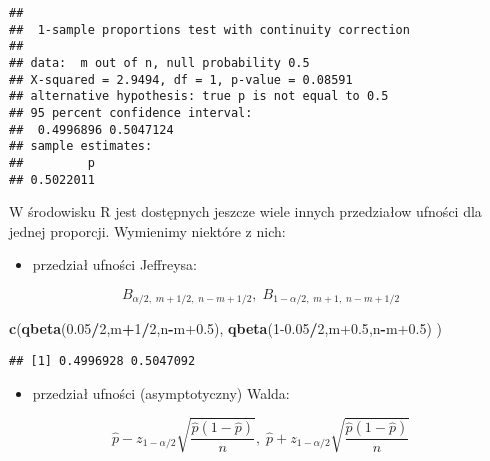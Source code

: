 \documentclass[polish,]{book}
\newenvironment{Shaded}{\begin{snugshade}}{\end{snugshade}}
\newcommand{\DecValTok}[1]{\textcolor[rgb]{0.00,0.00,0.81}{#1}}
\newcommand{\FloatTok}[1]{\textcolor[rgb]{0.00,0.00,0.81}{#1}}
\newcommand{\KeywordTok}[1]{\textcolor[rgb]{0.13,0.29,0.53}{\textbf{#1}}}
\newcommand{\NormalTok}[1]{#1}
\newcommand{\OperatorTok}[1]{\textcolor[rgb]{0.81,0.36,0.00}{\textbf{#1}}}
\providecommand{\tightlist}{%
  \setlength{\itemsep}{0pt}\setlength{\parskip}{0pt}}
\begin{document}
\begin{verbatim}
## 
##  1-sample proportions test with continuity correction
## 
## data:  m out of n, null probability 0.5
## X-squared = 2.9494, df = 1, p-value = 0.08591
## alternative hypothesis: true p is not equal to 0.5
## 95 percent confidence interval:
##  0.4996896 0.5047124
## sample estimates:
##         p 
## 0.5022011
\end{verbatim}

W środowisku R jest dostępnych jeszcze wiele innych przedziałow ufności dla
jednej proporcji. Wymienimy niektóre z nich:

\begin{itemize}
\tightlist
\item
  przedział ufności Jeffreysa:
\end{itemize}

\begin{equation}
B_{\alpha/2,\;m+1/2,\;n-m+1/2},\;B_{1-\alpha/2,\;m+1,\;n-m+1/2}
\label{eq:wz1159}
\end{equation}

\begin{Shaded}
\begin{Highlighting}[]
\KeywordTok{c}\NormalTok{(}\KeywordTok{qbeta}\NormalTok{(}\FloatTok{0.05}\OperatorTok{/}\DecValTok{2}\NormalTok{,m}\OperatorTok{+}\DecValTok{1}\OperatorTok{/}\DecValTok{2}\NormalTok{,n}\OperatorTok{-}\NormalTok{m}\FloatTok{+0.5}\NormalTok{), }\KeywordTok{qbeta}\NormalTok{(}\DecValTok{1}\FloatTok{-0.05}\OperatorTok{/}\DecValTok{2}\NormalTok{,m}\FloatTok{+0.5}\NormalTok{,n}\OperatorTok{-}\NormalTok{m}\FloatTok{+0.5}\NormalTok{) )}
\end{Highlighting}
\end{Shaded}

\begin{verbatim}
## [1] 0.4996928 0.5047092
\end{verbatim}

\begin{itemize}
\tightlist
\item
  przedział ufności (asymptotyczny) Walda:
\end{itemize}

\begin{equation}
\hat{p}-z_{1-\alpha/2}\sqrt{\frac{\hat{p}(1-\hat{p})}{n}},\;\hat{p}+z_{1-\alpha/2}\sqrt{\frac{\hat{p}(1-\hat{p})}{n}}
\label{eq:wz1160}
\end{equation}
\end{document}

